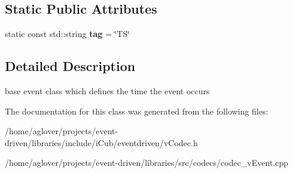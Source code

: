 \subsection*{Static Public Attributes}
\begin{DoxyCompactItemize}
\item 
static const std\+::string {\bfseries tag} = \char`\"{}TS\char`\"{}\hypertarget{classev_1_1vEvent_a54bcc0830c5993b56f1f47e23df1de8e}{}\label{classev_1_1vEvent_a54bcc0830c5993b56f1f47e23df1de8e}

\end{DoxyCompactItemize}


\subsection{Detailed Description}
base event class which defines the time the event occurs 

The documentation for this class was generated from the following files\+:\begin{DoxyCompactItemize}
\item 
/home/aglover/projects/event-\/driven/libraries/include/i\+Cub/eventdriven/v\+Codec.\+h\item 
/home/aglover/projects/event-\/driven/libraries/src/codecs/codec\+\_\+v\+Event.\+cpp\end{DoxyCompactItemize}
